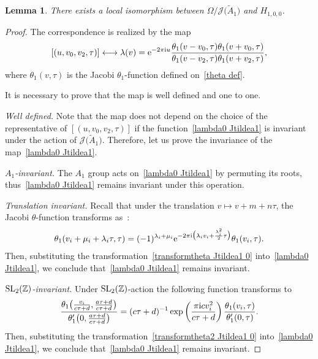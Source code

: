 \documentclass[10pt,a4paper]{amsart}
\numberwithin{equation}{section}
\newtheorem{Lemma}[Theorem]{Lemma}
\newcommand{\Ja}{\mathcal{J}}
\begin{document}
\begin{Lemma}\label{jacobiform1 Jtildea1}
There exists a local isomorphism between $\Omega/\Ja\big(\tilde A_1\big)$ and $H_{1,0,0}$.
\end{Lemma}
\begin{proof}
The correspondence is realized by the map
\begin{gather}\label{lambda0 Jtildea1}
[(u,v_0,v_2,\tau)]\longleftrightarrow \lambda(v)={\rm e}^{-2\pi {\rm i} u}\frac{\theta_1(v-v_0,\tau)\theta_1(v+v_0,\tau)}{\theta_1(v-v_2,\tau)\theta_1(v+v_2,\tau)},
\end{gather}
where $\theta_1(v,\tau)$ is the Jacobi $\theta_1$-function defined on~\eqref{theta def}.

It is necessary to prove that the map is well defined and one to one.

\textit{Well defined.} Note that the map does not depend on the choice of the representative of $[(u,v_0,v_2,\tau)]$ if the function~\eqref{lambda0 Jtildea1} is invariant under the action of $\Ja\big(\tilde A_1\big)$. Therefore, let us prove the invariance of the map~\eqref{lambda0 Jtildea1}.

\textit{$A_1$-invariant.}
The $A_1$ group acts on~\eqref{lambda0 Jtildea1} by permuting its roots, thus~\eqref{lambda0 Jtildea1} remains invariant under this operation.

\textit{Translation invariant.}
 Recall that under the translation $v\mapsto v+m+n\tau$, the Jacobi $\theta$-function transforms as~\cite{E.T.WhittakerandG.N.Watson}:
\begin{gather}
\label{transformtheta Jtildea1 0}
\theta_1(v_i+\mu_i+\lambda_i\tau,\tau)=(-1)^{\lambda_i+\mu_i}{\rm e}^{-2\pi {\rm i}\big(\lambda_iv_i+\frac{\lambda_i^2}{2}\tau\big)}\theta_1(v_i,\tau).
\end{gather}
Then, substituting the transformation~\eqref{transformtheta Jtildea1 0} into~\eqref{lambda0 Jtildea1}, we conclude that~\eqref{lambda0 Jtildea1} remains inva\-riant.

\textit{${\rm SL}_2(\mathbb{Z})$-invariant.}
Under ${\rm SL}_2(\mathbb{Z})$-action the following function transforms to
\begin{gather}\label{transformtheta2 Jtildea1 0}
\frac{\theta_1\big(\frac{v_i}{c\tau+d},\frac{a\tau+d}{c\tau+d}\big)}
{\theta_1^{\prime}\big(0,\frac{a\tau+d}{c\tau+d}\big)}
=(c\tau+d)^{-1}\exp\left(\frac{\pi {\rm i} cv_i^2 }{c\tau+d}\right)\frac{\theta_1(v_i,\tau)}{\theta_1^{\prime}(0,\tau)}.
\end{gather}
Then, substituting the transformation~\eqref{transformtheta2 Jtildea1 0} into~\eqref{lambda0 Jtildea1}, we conclude that~\eqref{lambda0 Jtildea1} remains inva\-riant.


\end{proof}
\end{document}
